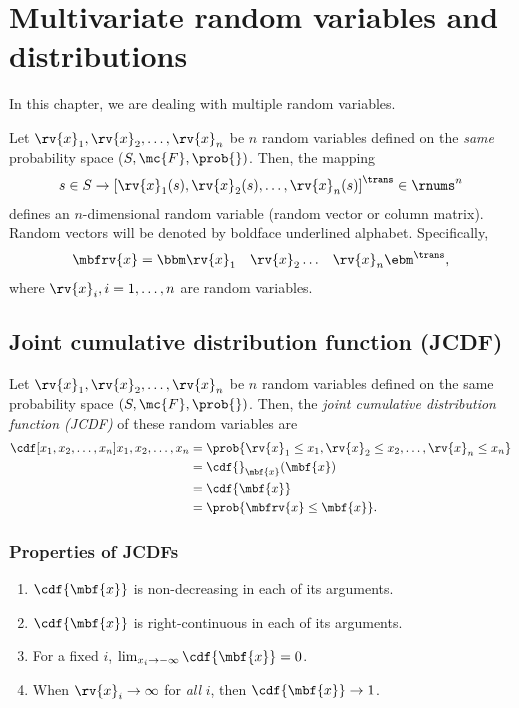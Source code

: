 \section{Multivariate random variables and distributions}
In this chapter, we are dealing with multiple random variables. 

\begin{mydefinition}
  Let $\rv{x}_{1}, \rv{x}_{2},\ldots,\rv{x}_n$ be $n$ random variables defined on the \emph{same} probability space ($S, \mc{F}, \prob{})$. Then, the mapping
  \begin{align}
      s\in S\to \left[ \rv{x}_{1}(s), \rv{x}_{2}(s),\ldots,\rv{x}_n(s) \right]^{\trans}\in\rnums^n
  \end{align}
  defines an $n$-dimensional random variable (random vector or column matrix). Random vectors will be denoted by boldface underlined alphabet. Specifically,
  \begin{align}
      \mbfrv{x} &= 
      \bbm \rv{x}_{1} & \rv{x}_{2} & \ldots &\rv{x}_n \ebm^{\trans},
  \end{align}
  where $\rv{x}_{i}, i=1,\ldots, n$ are random variables. 
\end{mydefinition}

\subsection{Joint cumulative distribution function (JCDF)}
\begin{mydefinition}
    Let $\rv{x}_{1}, \rv{x}_{2}, \ldots, \rv{x}_n$ be $n$ random variables defined on the same probability space $(S,\mc{F},\prob{})$. Then, the \emph{joint cumulative distribution function (JCDF)} of these random variables are 
    \begin{align}
        \cdf[x_{1},x_{2},\ldots,x_n]{x_{1},x_{2},\ldots,x_n} 
        &= \prob{\rv{x}_{1}\leq x_{1}, \rv{x}_{2}\leq x_{2}, \ldots, \rv{x}_n\leq x_n}\\
        &= \cdf{}_{\mbf{x}}(\mbf{x})\\
        &= \cdf{\mbf{x}}\\
        &= \prob{\mbfrv{x}\leq\mbf{x}}.
    \end{align}
\end{mydefinition}
\subsubsection*{Properties of JCDFs}
\begin{enumerate}
    \item $\cdf{\mbf{x}}$ is non-decreasing in each of its arguments.
    \item $\cdf{\mbf{x}}$ is right-continuous in each of its arguments.
    \item For a fixed $i$, $\lim_{x_{i}\to-\infty} \cdf{\mbf{x}}=0$.
    \item When $\rv{x}_{i}\to\infty$ for \emph{all} $i$, then $\cdf{\mbf{x}}\to 1$.
\end{enumerate}

